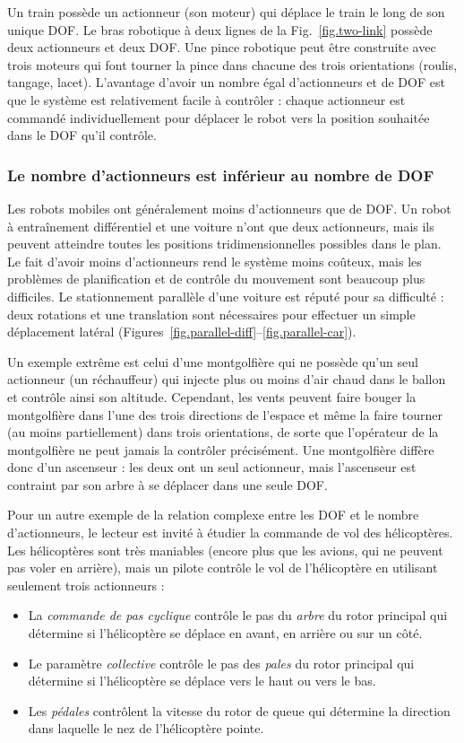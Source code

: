 Un train possède un actionneur (son moteur) qui déplace le train le long de son unique DOF. Le bras robotique à deux lignes de la Fig.~\ref{fig.two-link} possède deux actionneurs et deux DOF. Une pince robotique peut être construite avec trois moteurs qui font tourner la pince dans chacune des trois orientations (roulis, tangage, lacet). L'avantage d'avoir un nombre égal d'actionneurs et de DOF est que le système est relativement facile à contrôler : chaque actionneur est commandé individuellement pour déplacer le robot vers la position souhaitée dans le DOF qu'il contrôle.

\subsubsection*{Le nombre d'actionneurs est inférieur au nombre de DOF}

Les robots mobiles ont généralement moins d'actionneurs que de DOF. Un robot à entraînement différentiel et une voiture n'ont que deux actionneurs, mais ils peuvent atteindre toutes les positions tridimensionnelles possibles dans le plan. Le fait d'avoir moins d'actionneurs rend le système moins coûteux, mais les problèmes de planification et de contrôle du mouvement sont beaucoup plus difficiles. Le stationnement parallèle d'une voiture est réputé pour sa difficulté : deux rotations et une translation sont nécessaires pour effectuer un simple déplacement latéral (Figures~\ref{fig.parallel-diff}--\ref{fig.parallel-car}).

Un exemple extrême est celui d'une montgolfière qui ne possède qu'un seul actionneur (un réchauffeur) qui injecte plus ou moins d'air chaud dans le ballon et contrôle ainsi son altitude. Cependant, les vents peuvent faire bouger la montgolfière dans l'une des trois directions de l'espace et même la faire tourner (au moins partiellement) dans trois orientations, de sorte que l'opérateur de la montgolfière ne peut jamais la contrôler précisément. Une montgolfière diffère donc d'un ascenseur : les deux ont un seul actionneur, mais l'ascenseur est contraint par son arbre à se déplacer dans une seule DOF.

Pour un autre exemple de la relation complexe entre les DOF et le nombre d'actionneurs, le lecteur est invité à étudier la commande de vol des hélicoptères. Les hélicoptères sont très maniables (encore plus que les avions, qui ne peuvent pas voler en arrière), mais un pilote contrôle le vol de l'hélicoptère en utilisant seulement trois actionneurs :
\begin{itemize}
\item La \emph{commande de pas cyclique} contrôle le pas du \emph{arbre} du rotor principal qui détermine si l'hélicoptère se déplace en avant, en arrière ou sur un côté.
\item Le paramètre \emph{collective} contrôle le pas des \emph{pales} du rotor principal qui détermine si l'hélicoptère se déplace vers le haut ou vers le bas.
\item Les \emph{pédales} contrôlent la vitesse du rotor de queue qui détermine la direction dans laquelle le nez de l'hélicoptère pointe.
\end{itemize}

